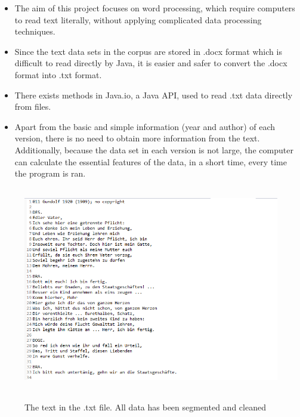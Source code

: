 \begin{itemize}
	\item \textbf{} The aim of this project focuses on word processing, which require computers to read text literally, without applying complicated data processing techniques.
	\item \textbf{} Since the text data sets in the corpus are stored in .docx format which is difficult to read directly by Java, it is easier and safer to convert the .docx format into .txt format.
	\item \textbf{} There exists methods in Java.io, a Java API, used to read .txt data directly from files.
	\item \textbf{} Apart from the basic and simple information (year and author) of each version, there is no need to obtain more information from the text. Additionally, because the data set in each version is not large, the computer can calculate the essential features of the data, in a short time, every time the program is ran. 
\end{itemize}
\begin{figure}[h]
	\centering	
	\includegraphics[width=13cm, height=9cm]{Figs/Data-example}\\[1ex]
	\caption{The text in the .txt file. All data has been segmented and cleaned}
	\label{fig:dataExample}
\end{figure}

